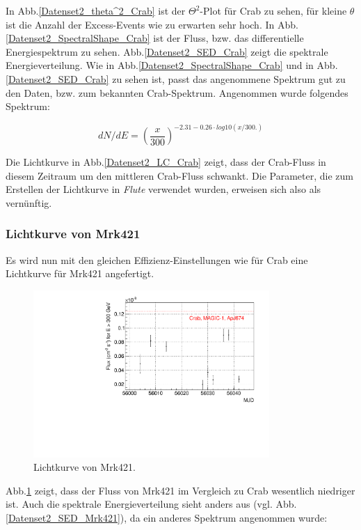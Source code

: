 In Abb.\ref{Datenset2_theta^2_Crab} ist der $\Theta^2$-Plot für Crab zu sehen, für kleine $\theta$ ist die Anzahl der Excess-Events wie zu erwarten sehr hoch.
In Abb.\ref{Datenset2_SpectralShape_Crab} ist der Fluss, bzw. das differentielle Energiespektrum zu sehen.
Abb.\ref{Datenset2_SED_Crab} zeigt die spektrale Energieverteilung.
Wie in Abb.\ref{Datenset2_SpectralShape_Crab} und in Abb.\ref{Datenset2_SED_Crab} zu sehen ist, passt das angenommene Spektrum gut zu den Daten, bzw. zum bekannten Crab-Spektrum.
Angenommen wurde folgendes Spektrum:

\begin{equation}
dN/dE=\left(\frac{x}{300}\right)^{-2.31-0.26\cdot log10(x/300.)}
\end{equation}

Die Lichtkurve in Abb.\ref{Datenset2_LC_Crab} zeigt, dass der Crab-Fluss in diesem Zeitraum um den mittleren Crab-Fluss schwankt.
Die Parameter, die zum Erstellen der Lichtkurve in \textit{Flute} verwendet wurden, erweisen sich also als vernünftig.

\subsubsection{Lichtkurve von Mrk421}
Es wird nun mit den gleichen Effizienz-Einstellungen wie für Crab eine Lichtkurve für Mrk421 angefertigt.

\begin{figure}
    \centering
    \includegraphics[width=0.8\textwidth]{./Plots/04_MrkAnalyse/Datenset2/LC_Mrk421.pdf}
    \caption{Lichtkurve von Mrk421.}
    \label{Datenset2_LC_Mrk421}
\end{figure}

Abb.\ref{Datenset2_LC_Mrk421} zeigt, dass der Fluss von Mrk421 im Vergleich zu Crab wesentlich niedriger ist.
Auch die spektrale Energieverteilung sieht anders aus (vgl. Abb.\ref{Datenset2_SED_Mrk421}), da ein anderes Spektrum angenommen wurde:

